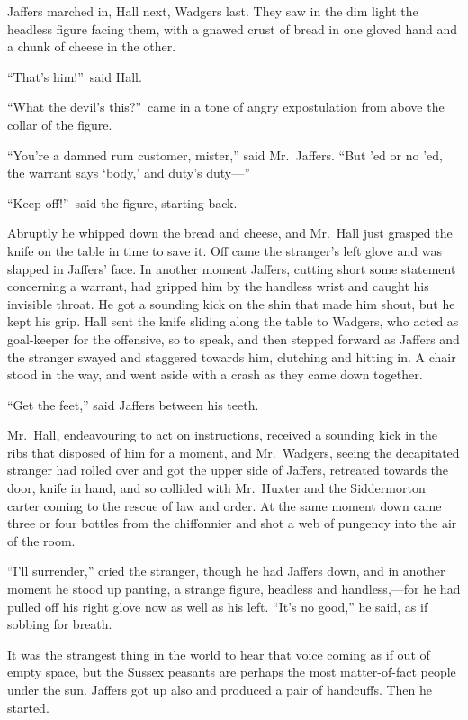 Jaffers marched in, Hall next, Wadgers last. They saw in the dim light the headless figure facing them, with a gnawed crust of bread in one gloved hand and a chunk of cheese in the other.

“That’s him!”\ said Hall.

“What the devil’s this?”\ came in a tone of angry expostulation from above the collar of the figure.

“You’re a damned rum customer, mister,” said Mr.\ Jaffers. “But ’ed or no ’ed, the warrant says ‘body,’ and duty’s duty—”

“Keep off!”\ said the figure, starting back.

Abruptly he whipped down the bread and cheese, and Mr.\ Hall just grasped the knife on the table in time to save it. Off came the stranger’s left glove and was slapped in Jaffers’ face. In another moment Jaffers, cutting short some statement concerning a warrant, had gripped him by the handless wrist and caught his invisible throat. He got a sounding kick on the shin that made him shout, but he kept his grip. Hall sent the knife sliding along the table to Wadgers, who acted as goal-keeper for the offensive, so to speak, and then stepped forward as Jaffers and the stranger swayed and staggered towards him, clutching and hitting in. A chair stood in the way, and went aside with a crash as they came down together.

“Get the feet,” said Jaffers between his teeth.

Mr.\ Hall, endeavouring to act on instructions, received a sounding kick in the ribs that disposed of him for a moment, and Mr.\ Wadgers, seeing the decapitated stranger had rolled over and got the upper side of Jaffers, retreated towards the door, knife in hand, and so collided with Mr.\ Huxter and the Siddermorton carter coming to the rescue of law and order. At the same moment down came three or four bottles from the chiffonnier and shot a web of pungency into the air of the room.

“I’ll surrender,” cried the stranger, though he had Jaffers down, and in another moment he stood up panting, a strange figure, headless and handless,—for he had pulled off his right glove now as well as his left. “It’s no good,” he said, as if sobbing for breath.

It was the strangest thing in the world to hear that voice coming as if out of empty space, but the Sussex peasants are perhaps the most matter-of-fact people under the sun. Jaffers got up also and produced a pair of handcuffs. Then he started.

